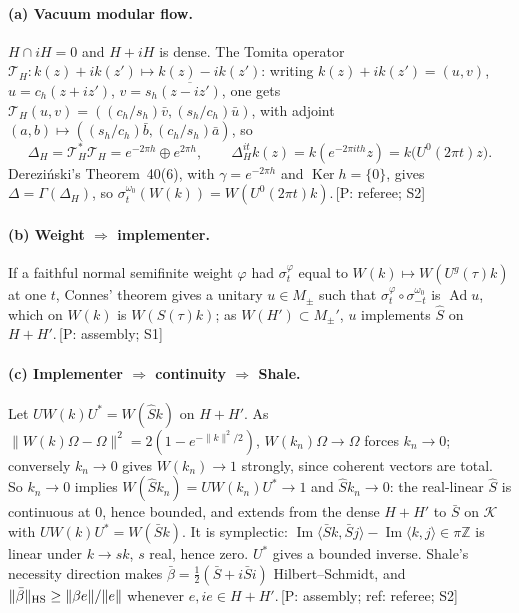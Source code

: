 \documentclass[11pt]{article}
\newcommand{\cK}{\mathcal{K}}
\newcommand{\cT}{\mathcal{T}}
\newcommand{\ip}[2]{\langle #1,#2\rangle}
\newcommand{\ev}[1]{\,{\textsf{\scriptsize[#1]}}}
\begin{document}
\paragraph{(a) Vacuum modular flow.} $H\cap iH=0$ and $H+iH$ is dense. The Tomita operator $\cT_H:k(z)+ik(z')\mapsto k(z)-ik(z')$: writing $k(z)+ik(z')=(u,v)$, $u=c_h(z+iz')$, $v=s_h\overline{(z-iz')}$, one gets $\cT_H(u,v)=((c_h/s_h)\bar v,(s_h/c_h)\bar u)$, with adjoint $(a,b)\mapsto((s_h/c_h)\bar b,(c_h/s_h)\bar a)$, so
\[
\Delta_H=\cT_H^*\cT_H=e^{-2\pi h}\oplus e^{2\pi h},\qquad \Delta_H^{it}k(z)=k(e^{-2\pi ith}z)=k\bigl(U^0(2\pi t)z\bigr).
\]
Dere\-zi\'nski's Theorem~40(6), with $\gamma=e^{-2\pi h}$ and $\operatorname{Ker}h=\{0\}$, gives $\Delta=\Gamma(\Delta_H)$, so $\sigma^{\omega_0}_t(W(k))=W(U^0(2\pi t)k)$.\ev{P: referee; S2}

\paragraph{(b) Weight $\Rightarrow$ implementer.} If a faithful normal semifinite weight $\varphi$ had $\sigma^\varphi_t$ equal to $W(k)\mapsto W(U^g(\tau)k)$ at one $t$, Connes' theorem gives a unitary $u\in M_\pm$ such that $\sigma^\varphi_t\circ\sigma^{\omega_0}_{-t}$ is $\operatorname{Ad}u$, which on $W(k)$ is $W(S(\tau)k)$; as $W(H')\subset M_\pm'$, $u$ implements $\hat S$ on $H+H'$.\ev{P: assembly; S1}

\paragraph{(c) Implementer $\Rightarrow$ continuity $\Rightarrow$ Shale.} Let $UW(k)U^*=W(\hat Sk)$ on $H+H'$. As $\|W(k)\Omega-\Omega\|^2=2(1-e^{-\|k\|^2/2})$, $W(k_n)\Omega\to\Omega$ forces $k_n\to0$; conversely $k_n\to0$ gives $W(k_n)\to1$ strongly, since coherent vectors are total. So $k_n\to0$ implies $W(\hat Sk_n)=UW(k_n)U^*\to1$ and $\hat Sk_n\to0$: the real-linear $\hat S$ is continuous at $0$, hence bounded, and extends from the dense $H+H'$ to $\bar S$ on $\cK$ with $UW(k)U^*=W(\bar Sk)$. It is symplectic: $\operatorname{Im}\ip{\bar Sk}{\bar Sj}-\operatorname{Im}\ip kj\in\pi\mathbb Z$ is linear under $k\to sk$, $s$ real, hence zero. $U^*$ gives a bounded inverse. Shale's necessity direction makes $\bar\beta=\frac12(\bar S+i\bar Si)$ Hilbert--Schmidt, and $\|\bar\beta\|_{\rm HS}\ge\|\beta e\|/\|e\|$ whenever $e,ie\in H+H'$.\ev{P: assembly; ref: referee; S2}
\end{document}
